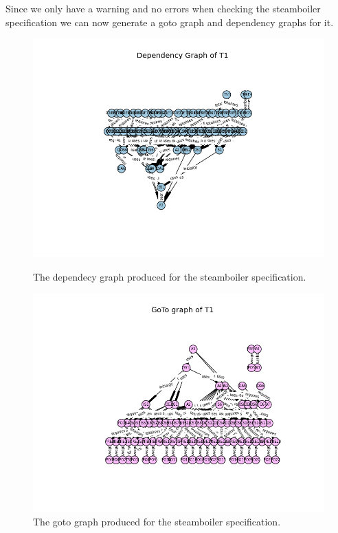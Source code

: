 Since we only have a warning and no errors when checking the steamboiler specification we can now generate a goto graph and dependency graphs for it.

\begin{figure}[H]
\centering
\begin{minipage}{0.45\textwidth}
\centering
\includegraphics[trim=4cm 1cm 1cm 1cm, scale=0.5]{examples/steamboiler/25a.png}
\vspace{-0.18in}
\caption{The dependecy graph produced for the steamboiler specification. \label{fig:steamdepgraph}}
\vspace{-0.2in}
\end{minipage}\hfill
\begin{minipage}{0.43\textwidth}
\centering
\includegraphics[trim=4cm 1cm 1cm 1cm, scale=0.5]{examples/steamboiler/25b.png}
\vspace{-0.2in}
\caption{The goto graph produced for the steamboiler specification. \label{fig:steamgotograph}}
\vspace{-0.2in}
\end{minipage}
\end{figure}

